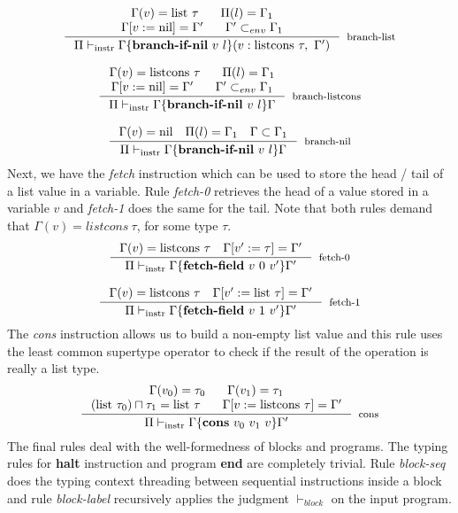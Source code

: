 \documentclass[sigconf]{acmart}
\theoremstyle{definition}
\begin{document}
\[
\begin{array}{c}
\inference{\Gamma(v) = \text{list}~\tau\:\:\:\:\:\:\:\:\Pi(l) = \Gamma_1\\
                     \Gamma[v:=\text{nil}]=\Gamma'\:\:\:\:\:\:\:\:\Gamma' \subset_{env} \Gamma_1}
          {\Pi \vdash_{\text{instr}} \Gamma\{ \textbf{branch-if-nil}~v~l \}(v: \text{listcons}~\tau,~\Gamma')}
          [branch-list]
\\ \\

\inference{\Gamma(v) = \text{listcons}~\tau\:\:\:\:\:\:\:\:\Pi(l) = \Gamma_1\\
           \Gamma[v:=\text{nil}]=\Gamma'\:\:\:\:\:\:\:\:\Gamma' \subset_{env} \Gamma_1}
          {\Pi \vdash_{\text{instr}} \Gamma\{ \textbf{branch-if-nil}~v~l \}\Gamma}[branch-listcons]

\\ \\
\inference{\Gamma(v) = \text{nil}~~~\Pi(l) = \Gamma_1~~~\Gamma \subset \Gamma_1}
          {\Pi \vdash_{\text{instr}} \Gamma\{ \textbf{branch-if-nil}~v~l \}\Gamma}
          [branch-nil]
\end{array}
\]
Next, we have the \emph{fetch} instruction which can be used to store the head / tail of a list value in
a variable. Rule \emph{fetch-0} retrieves the head of a value stored in a variable $v$ and \emph{fetch-1}
does the same for the tail. Note that both rules demand that $\Gamma(v) = listcons\:\tau$, for some type
$\tau$.
\[
\begin{array}{c}
\inference{\Gamma(v) = \text{listcons}~\tau~~~\Gamma[v':=\tau]=\Gamma'}
          {\Pi \vdash_{\text{instr}} \Gamma\{ \textbf{fetch-field}~v~0~v' \}\Gamma'}[fetch-0]
          \\ \\
\inference{\Gamma(v) = \text{listcons}~\tau~~~\Gamma[v':=\text{list}~\tau]=\Gamma'}
          {\Pi \vdash_{\text{instr}} \Gamma\{ \textbf{fetch-field}~v~1~v' \}\Gamma'}[fetch-1]
\end{array}
\]
The \emph{cons} instruction allows us to build a non-empty list value and this rule uses the least
common supertype operator to check if the result of the operation is really a list type.
\[
\inference{\Gamma(v_0) = \tau_0\:\:\:\:\:\:\:\:\Gamma(v_1) = \tau_1 \\
           (\text{list}~\tau_0) \sqcap \tau_1=\text{list}~\tau\:\:\:\:\:\:\:\:\Gamma[v:=\text{listcons}~\tau]=\Gamma'}
          {\Pi \vdash_{\text{instr}} \Gamma\{ \textbf{cons}~v_0~v_1~v \}\Gamma'}[cons]
\]
The final rules deal with the well-formedness of blocks and programs. The typing rules for \textbf{halt} instruction and
program \textbf{end} are completely trivial. Rule \emph{block-seq} does the typing context threading between sequential
instructions inside a block and rule \emph{block-label} recursively applies the judgment $\vdash_{block}$ on the
input program.
\end{document}
